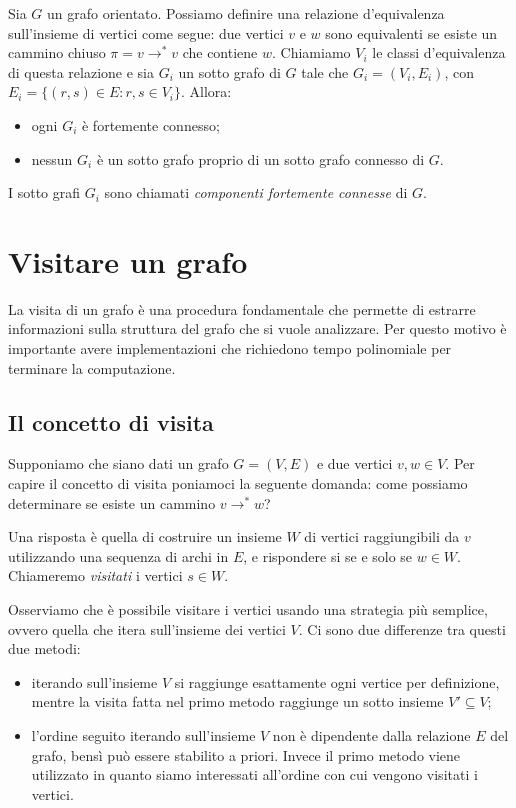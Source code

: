 Sia $G$ un grafo orientato. Possiamo definire una relazione
d'equivalenza sull'insieme di vertici come segue: due vertici $v$ e
$w$ sono equivalenti se esiste un cammino chiuso $\pi = v
\rightarrow^{*} v$ che contiene $w$. Chiamiamo $V_{i}$ le classi
d'equivalenza di questa relazione e sia $G_{i}$ un sotto grafo di $G$
tale che $G_{i} = (V_{i}, E_{i})$, con $E_{i} = \{(r,s) \in E: r,s \in
V_{i} \}$. Allora:
\begin{itemize}
\item ogni $G_{i}$ \`e fortemente connesso;
\item nessun $G_{i}$ \`e un sotto grafo proprio di un sotto grafo
  connesso di $G$.
\end{itemize}
I sotto grafi $G_{i}$ sono chiamati \emph{componenti fortemente
  connesse} di $G$.


\section{Visitare un grafo}

La visita di un grafo \`e una procedura fondamentale che permette di
estrarre informazioni sulla struttura del grafo che si vuole
analizzare. Per questo motivo \`e importante avere implementazioni che
richiedono tempo polinomiale per terminare la computazione.

\subsection{Il concetto di visita}
Supponiamo che siano dati un grafo $G = (V, E)$ e due vertici $v,w \in
V$. Per capire il concetto di visita poniamoci la seguente domanda:
come possiamo determinare se esiste un cammino $v \rightarrow^{*} w$?

Una risposta \`e quella di costruire un insieme $W$ di vertici
raggiungibili da $v$ utilizzando una sequenza di archi in $E$, e
rispondere si se e solo se $w \in W$. Chiameremo \emph{visitati} i
vertici $s \in W$. 

Osserviamo che \`e possibile visitare i vertici usando una strategia
pi\`u semplice, ovvero quella che itera sull'insieme dei vertici
$V$. Ci sono due differenze tra questi due metodi:
\begin{itemize}
\item iterando sull'insieme $V$ si raggiunge esattamente ogni vertice
  per definizione, mentre la visita fatta nel primo metodo raggiunge
  un sotto insieme $V' \subseteq V$;
\item l'ordine seguito iterando sull'insieme $V$ non \`e dipendente
  dalla relazione $E$ del grafo, bens\`i pu\`o essere stabilito a
  priori. Invece il primo metodo viene utilizzato in quanto siamo
  interessati all'ordine con cui vengono visitati i vertici.
\end{itemize}

